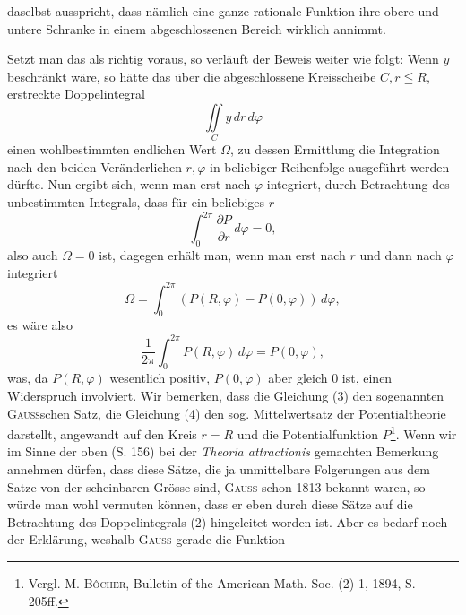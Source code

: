 daselbst ausspricht, dass nämlich eine ganze rationale Funktion ihre obere
und untere Schranke in einem abgeschlossenen Bereich wirklich annimmt.\par
\clearpage{}
\noindent Setzt man das als richtig voraus, so verläuft der Beweis weiter wie folgt:
Wenn \(y\) beschränkt wäre, so hätte das über die abgeschlossene Kreisscheibe
\(C,r\leqq R\), erstreckte Doppelintegral
\begingroup\makeatletter\tagsleft@true\let\veqno\leqno\makeatother
\begin{equation*}
\iint\limits_C y\,dr\,d\varphi\tag{2}
\end{equation*}
\endgroup
\noindent einen wohlbestimmten endlichen Wert \(\Omega\), zu dessen Ermittlung die Integration
nach den beiden Veränderlichen \(r,\varphi\) in beliebiger Reihenfolge ausgeführt
werden dürfte. Nun ergibt sich, wenn man erst nach \(\varphi\) integriert, durch Betrachtung
des unbestimmten Integrals, dass für ein beliebiges \(r\)
\begingroup\makeatletter\tagsleft@true\let\veqno\leqno\makeatother
\begin{equation*}
\int_0^{2\pi}\frac{\partial P}{\partial r}\,d\varphi=0,\tag{3}
\end{equation*}
\endgroup
\noindent also auch \(\Omega=0\) ist, dagegen erhält man, wenn man erst nach \(r\) und dann
nach \(\varphi\) integriert
\[
\Omega=\int_0^{2\pi}(P(R,\varphi)-P(0,\varphi))\,d\varphi,
\]
es wäre also
\begingroup\makeatletter\tagsleft@true\let\veqno\leqno\makeatother
\begin{equation*}
\frac1{2\pi}\int_0^{2\pi}P(R,\varphi)\,d\varphi=P(0,\varphi),\tag{4}
\end{equation*}
\endgroup
\noindent was, da \(P(R,\varphi)\) wesentlich positiv, \(P(0,\varphi)\) aber gleich \(0\) ist, einen Widerspruch
involviert. Wir bemerken, dass die Gleichung (3) den sogenannten
\textsc{Gauss}schen Satz, die Gleichung (4) den sog. Mittelwertsatz der Potentialtheorie
darstellt, angewandt auf den Kreis \(r=R\) und die Potentialfunktion \(P\)\footnote{Vergl. M. \textsc{Bôcher}, Bulletin of the American Math. Soc. (2) 1, 1894, S. 205ff.}.
Wenn wir im Sinne der oben (S. 156) bei der \textit{Theoria attractionis} gemachten
Bemerkung annehmen dürfen, dass diese Sätze, die ja unmittelbare Folgerungen
aus dem Satze von der scheinbaren Grösse sind, \textsc{Gauss} schon 1813
bekannt waren, so würde man wohl vermuten können, dass er eben durch
diese Sätze auf die Betrachtung des Doppelintegrals (2) hingeleitet worden
ist. Aber es bedarf noch der Erklärung, weshalb \textsc{Gauss} gerade die Funktion
